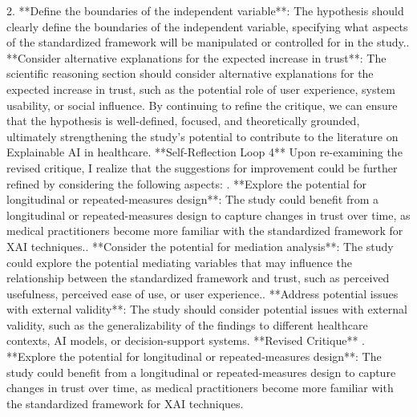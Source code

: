 \documentclass{article}%
\begin{document}
2. **Define the boundaries of the independent variable**: The hypothesis should clearly define the boundaries of the independent variable, specifying what aspects of the standardized framework will be manipulated or controlled for in the study.. **Consider alternative explanations for the expected increase in trust**: The scientific reasoning section should consider alternative explanations for the expected increase in trust, such as the potential role of user experience, system usability, or social influence.\newline%
\newline%
By continuing to refine the critique, we can ensure that the hypothesis is well{-}defined, focused, and theoretically grounded, ultimately strengthening the study's potential to contribute to the literature on Explainable AI in healthcare.\newline%
\newline%
**Self{-}Reflection Loop 4**\newline%
\newline%
Upon re{-}examining the revised critique, I realize that the suggestions for improvement could be further refined by considering the following aspects:\newline%
. **Explore the potential for longitudinal or repeated{-}measures design**: The study could benefit from a longitudinal or repeated{-}measures design to capture changes in trust over time, as medical practitioners become more familiar with the standardized framework for XAI techniques.. **Consider the potential for mediation analysis**: The study could explore the potential mediating variables that may influence the relationship between the standardized framework and trust, such as perceived usefulness, perceived ease of use, or user experience.. **Address potential issues with external validity**: The study should consider potential issues with external validity, such as the generalizability of the findings to different healthcare contexts, AI models, or decision{-}support systems.\newline%
\newline%
**Revised Critique**\newline%
. **Explore the potential for longitudinal or repeated{-}measures design**: The study could benefit from a longitudinal or repeated{-}measures design to capture changes in trust over time, as medical practitioners become more familiar with the standardized framework for XAI techniques.\newline%
\end{document}
